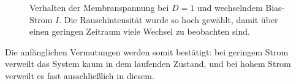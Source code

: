 \documentclass[12pt,a4paper]{article}
\begin{document}
\begin{figure}[H]
	\caption{Verhalten der Membranspannung bei $D=1$ und wechselndem Bias-Strom $I$. Die Rauschintensität wurde so hoch gewählt, damit über einen geringen Zeitraum viele Wechsel zu beobachten sind.}
	\label{currentnoise} 
\end{figure}
Die anfänglichen Vermutungen werden somit bestätigt: bei geringem Strom verweilt das System kaum in dem laufenden Zustand, und bei hohem Strom verweilt es fast ausschließlich in diesem.
\end{document}

